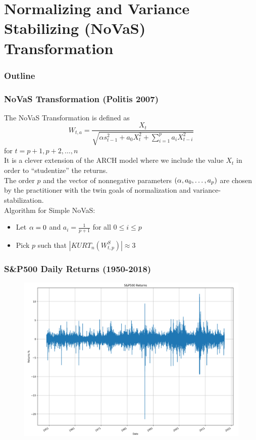 \documentclass{beamer}
\begin{document}
\section{Normalizing and Variance Stabilizing (NoVaS) Transformation}

\begin{frame}
\frametitle{Outline}
\tableofcontents[currentsection]
\end{frame}

\begin{frame}
\frametitle{NoVaS Transformation (Politis 2007)}
The NoVaS Transformation is defined as $$ W_{t,a} = \frac{X_t}{\sqrt{\alpha s^2_{t-1} + a_0 X^2_{t} + \sum_{i=1}^{p} a_i X^2_{t-i}}}$$ for $t=p+1,p+2,\dots,n$ \\
\vspace{3pt}
It is a clever extension of the ARCH model where we include the value $X_t$ in order to ``studentize'' the returns.\\
\vspace{5pt}
The order $p$ and the vector of nonnegative parameters $(\alpha,a_0,\dots,a_p)$ are chosen by the practitioner with the twin goals of normalization and variance-stabilization.\\
\vspace{5pt}
Algorithm for Simple NoVaS:
\begin{itemize}
\item{Let $\alpha = 0$ and $a_i = \frac{1}{p+1}$ for all $0 \leq i \leq p$}
\item{Pick $p$ such that $|KURT_{n}(W_{t,p}^{S})| \approx 3$}
\end{itemize}




\end{frame}


\begin{frame}
\frametitle{S\&P500 Daily Returns (1950-2018)}
\begin{figure}[h!]
\centering 
\includegraphics[width=\textwidth]{sp500_returns.png}
\end{figure}
\end{frame}
\end{document}
